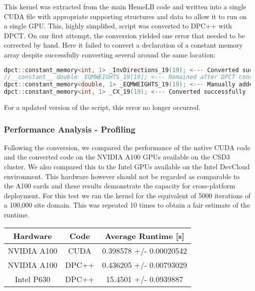 This kernel was extracted from the main HemeLB code and written into a single CUDA file with appropriate supporting structures and data to allow it to run on a single GPU. This, highly simplified, script was converted to DPC++ with DPCT. On our first attempt, the conversion yielded one error that needed to be corrected by hand. Here it failed to convert a declaration of a constant memory array despite successfully converting several around the same location:

\begin{lstlisting}[language=C++,basicstyle=\small]
dpct::constant_memory<int, 1> _InvDirections_19(19); <--- Converted successfully
//__constant__ double _EQMWEIGHTS_19[19]; <--- Remained after DPCT conversion
dpct::constant_memory<double, 1> _EQMWEIGHTS_19(19); <--- Manually added
dpct::constant_memory<int, 1> _CX_19(19); <--- Converted successfully
\end{lstlisting}

For a updated version of the script, this error no longer occurred.

\subsubsection{Performance Analysis - Profiling}
Following the conversion, we compared the performance of the native CUDA code and the converted code on the NVIDIA A100 GPUs available on the CSD3 cluster. We also compared this to the Intel GPUs available on the Intel DevCloud environment. This hardware however should not be regarded as comparable to the A100 cards and these results demonstrate the capacity for cross-platform deployment. For this test we ran the kernel for the equivalent of 5000 iterations of a 100,000 site domain. This was repeated 10 times to obtain a fair estimate of the runtime.

\begin{center}
	\begin{tabular}{||c c c||}
		\hline
		Hardware    & Code  & Average Runtime [s]     \\ [0.5ex]
		\hline\hline
		NVIDIA A100 & CUDA  & 0.398578 +/- 0.00020542 \\
		\hline
		NVIDIA A100 & DPC++ & 0.436205 +/- 0.00793029 \\
		\hline
		Intel P630  & DPC++ & 15.4501 +/- 0.0939887   \\ [1ex]
		\hline
	\end{tabular}
\end{center}

